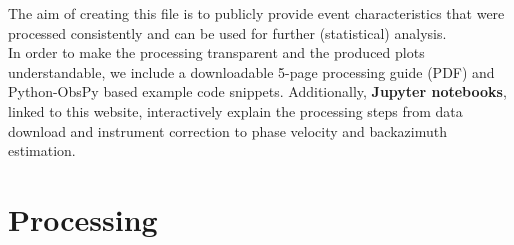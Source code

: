 \documentclass[12pt,reqno,letter]{article} %
\begin{document}
The aim of creating this file is to publicly provide event characteristics that were processed consistently and can be used for further (statistical) analysis.\\
In order to make the processing transparent and the produced plots understandable, we include a downloadable 5-page processing guide (PDF) and Python-ObsPy based example code snippets. Additionally, \textbf{Jupyter notebooks}, linked to this website, interactively explain the processing steps from data download and instrument correction to phase velocity and backazimuth estimation.
%
%
\section{Processing}
\label{sec:processing}
\end{document}
